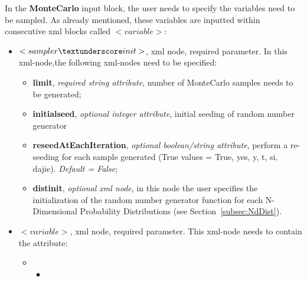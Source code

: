 In the \textbf{MonteCarlo} input block, the user needs to specify the variables need to be sampled. As already mentioned, these variables are inputted within consecutive xml blocks called $<variable>$:
\begin{itemize}
\item $<sampler\textunderscore init>$, xml node, required parameter. In this xml-node,the following xml-nodes need to be specified:
  \begin{itemize}
    \item \textbf{limit}, \textit{required string attribute}, number of MonteCarlo samples needs to be generated; 
    \item \textbf{initial\textunderscore seed}, \textit{optional integer attribute}, initial seeding of random number generator
    \item \textbf{reseedAtEachIteration}, \textit{optional boolean/string attribute}, perform a re-seeding for each sample generated (True values = True, yes, y, t, si, dajie). \textit{Default = False}; 
    \item \textbf{dist\textunderscore init}, \textit{optional xml node}, in this node the user specifies the initialization of the random number generator function for each N-Dimensional Probability Distributions (see Section~\ref{subsec:NdDist}). 
  \end{itemize}
\item $<variable>$, xml node, required parameter. This xml-node needs to contain the attribute:
\begin{itemize}
\item \variableDescription
 \variableChildIntro
 \begin{itemize}
    \item \distributionDescription
  \end{itemize}
\end{itemize}
\end{itemize}

